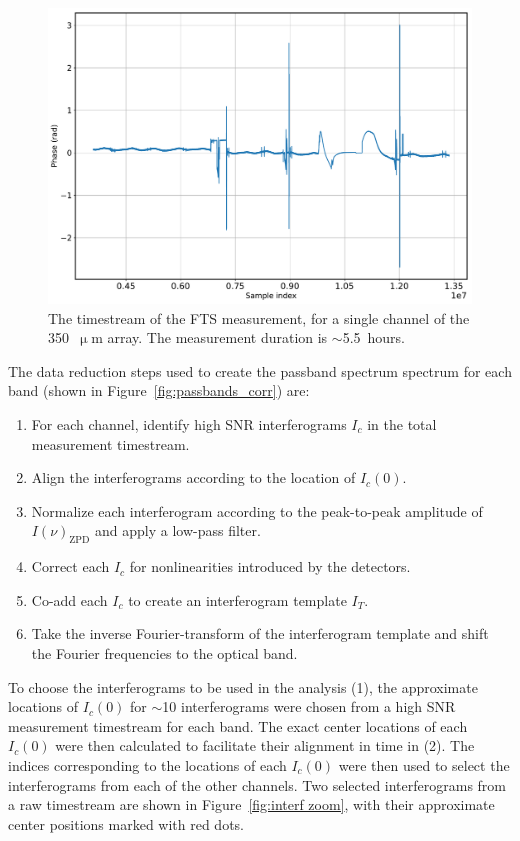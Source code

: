 \begin{figure}[!htbp]
\centering
\includegraphics[width=\textwidth]{figures/blast_data/fts/fts_long_raw}
\caption[The timestream of the FTS measurement, for a single channel of the  array.]{The timestream of the FTS measurement, for a single channel of the 350~$\upmu$m array. The measurement duration is $\sim$5.5~hours.}
\label{fig:fts total meas}
\end{figure}

The data reduction steps used to create the passband spectrum spectrum for each band (shown in Figure~\ref{fig:passbands_corr}) are:

\begin{enumerate}[nosep]
  \item For each channel, identify high SNR interferograms $I_{c}$ in the total measurement timestream.
  \item Align the interferograms according to the location of $I_{c}(0)$.
  \item Normalize each interferogram according to the peak-to-peak amplitude of $I(\nu)_{\mathrm{ZPD}}$ and apply a low-pass filter.
  \item Correct each $I_{c}$ for nonlinearities introduced by the detectors.
  \item Co-add each $I_{c}$ to create an interferogram template $I_{T}$.
  \item Take the inverse Fourier-transform of the interferogram template and shift the Fourier frequencies to the optical band.
\end{enumerate}

To choose the interferograms to be used in the analysis (1), the approximate locations of $I_{c}(0)$ for $\sim$10 interferograms were chosen from a high SNR measurement timestream for each band. The exact center locations of each $I_{c}(0)$ were then calculated to facilitate their alignment in time in (2). The indices corresponding to the locations of each $I_{c}(0)$ were then used to select the interferograms from each of the other channels. Two selected interferograms from a raw timestream are shown in Figure~\ref{fig:interf zoom}, with their approximate center positions marked with red dots.


